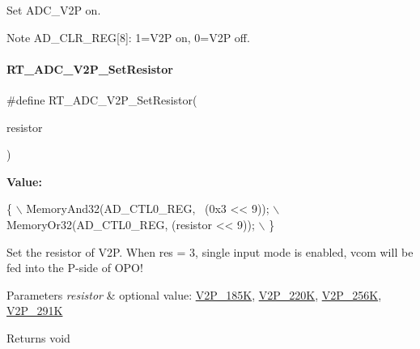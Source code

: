 Set A\+D\+C\+\_\+\+V2P on. 

\begin{DoxyNote}{Note}
A\+D\+\_\+\+C\+L\+R\+\_\+\+R\+EG\mbox{[}8\mbox{]}\+: 1=V2P on, 0=V2P off. 
\end{DoxyNote}
\mbox{\label{a00002_ab24203a1eff5816f48761f0e38337d67}} 
\paragraph{\texorpdfstring{R\+T\+\_\+\+A\+D\+C\+\_\+\+V2\+P\+\_\+\+Set\+Resistor}{RT\_ADC\_V2P\_SetResistor}}
{\footnotesize\ttfamily \#define R\+T\+\_\+\+A\+D\+C\+\_\+\+V2\+P\+\_\+\+Set\+Resistor(\begin{DoxyParamCaption}\item[{}]{resistor }\end{DoxyParamCaption})}

{\bfseries Value\+:}
\begin{DoxyCode}
\{                                          \(\backslash\)
        MemoryAnd32(AD\_CTL0\_REG, ~(0x3 << 9)); \(\backslash\)
        MemoryOr32(AD\_CTL0\_REG, (resistor << 9));   \(\backslash\)
    \}
\end{DoxyCode}


Set the resistor of V2P. When res = 3, single input mode is enabled, vcom will be fed into the P-\/side of O\+P\+O! 


\begin{DoxyParams}{Parameters}
{\em resistor} & optional value\+: \mbox{\hyperlink{a00002_a80255c41c3764feff9b79664f15feb46aa035ba8725fe8565c5505a295c22ea8e}{V2\+P\+\_\+185K}}, \mbox{\hyperlink{a00002_a80255c41c3764feff9b79664f15feb46a1ac9774056594cac22ae2c6431fa4277}{V2\+P\+\_\+220K}}, \mbox{\hyperlink{a00002_a80255c41c3764feff9b79664f15feb46a4b7eb698a06cc149cbb1b7f8f4dd4a8e}{V2\+P\+\_\+256K}}, \mbox{\hyperlink{a00002_a80255c41c3764feff9b79664f15feb46ae20e5b8adb1fa31fa8df9a56d05e7eb5}{V2\+P\+\_\+291K}} \\
\hline
\end{DoxyParams}
\begin{DoxyReturn}{Returns}
void 
\end{DoxyReturn}
\mbox{\label{a00002_ab44c37130776b81ef554d8967fcf9e62}} 
